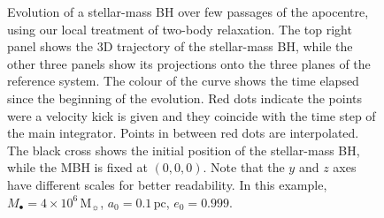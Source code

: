 \documentclass[desactivate]{aa}
\begin{document}
        \begin{figure}
            \centering
            \caption{Evolution of a stellar-mass BH over few passages of the apocentre, using our local treatment of two-body relaxation. The top right panel shows the 3D trajectory of the stellar-mass BH, while the other three panels show its projections onto the three planes of the reference system. The colour of the curve shows the time elapsed since the beginning of the evolution. Red dots indicate the points were a velocity kick is given and they coincide with the time step of the main integrator. Points in between red dots are interpolated. The black cross shows the initial position of the stellar-mass BH, while the MBH is fixed at $(0,0,0)$. Note that the $y$ and $z$ axes have different scales for better readability. In this example, $M_\bullet = 4 \times 10^6 \, \mathrm{M}_\sun$, $a_0 = 0.1 \, \mathrm{pc}$, $e_0=0.999$.}
            \label{fig:orbits_local}
        \end{figure}
        
\end{document}
